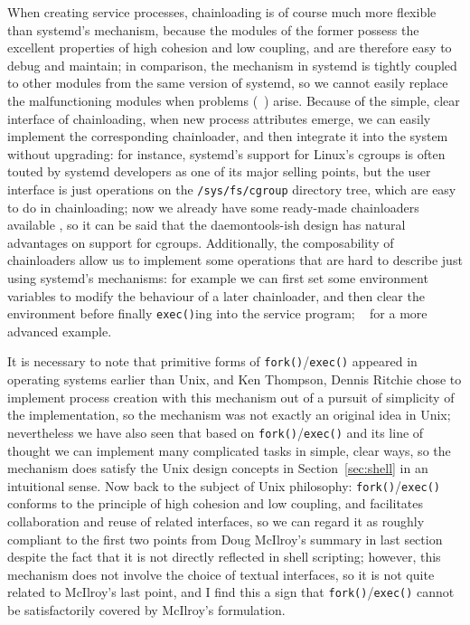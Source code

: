 When creating service processes, chainloading is of course much more flexible
than systemd's mechanism, because the modules of the former possess the
excellent properties of high cohesion and low coupling, and are therefore easy
to debug and maintain; in comparison, the mechanism in systemd is tightly
coupled to other modules from the same version of systemd, so we cannot easily
replace the malfunctioning modules when problems (\eg~\parencite{edge2017})
arise.  Because of the simple, clear interface of chainloading, when new process
attributes emerge, we can easily implement the corresponding chainloader, and
then integrate it into the system without upgrading: for instance, systemd's
support for Linux's cgroups is often touted by systemd developers as one of its
major selling points, but the user interface is just
operations on the \verb|/sys/fs/cgroup| directory tree, which are easy to do in
chainloading; now we already have some ready-made chainloaders available%
, so it can be said that the daemontools-ish design has
natural advantages on support for cgroups.  Additionally, the composability of
chainloaders allow us to implement some operations that are hard to describe
just using systemd's mechanisms: for example we can first set some environment
variables to modify the behaviour of a later chainloader, and then clear the
environment before finally \verb|exec()|ing into the service program;
\cf~\parencite{ska:syslogd} for a more advanced example.

It is necessary to note that primitive forms of \verb|fork()|/\verb|exec()|
appeared in operating systems earlier than Unix, and
Ken Thompson, Dennis Ritchie \etal{} chose to implement process creation with
this mechanism out of a pursuit of simplicity of the implementation, so the
mechanism was not exactly an original idea in Unix; nevertheless we have also
seen that based on \verb|fork()|/\verb|exec()| and its line of thought we can
implement many complicated tasks in simple, clear ways, so the mechanism does
satisfy the Unix design concepts in Section~\ref{sec:shell} in an intuitional
sense.  Now back to the subject of Unix philosophy: \verb|fork()|/\verb|exec()|
conforms to the principle of high cohesion and low coupling, and facilitates
collaboration and reuse of related interfaces, so we can regard it as roughly
compliant to the first two points from Doug McIlroy's summary in last
section despite the fact that it is not directly reflected in shell
scripting; however, this mechanism does not involve the choice of
textual interfaces, so it is not quite related to McIlroy's last point,
and I find this a sign that \verb|fork()|/\verb|exec()| cannot
be satisfactorily covered by McIlroy's formulation.

